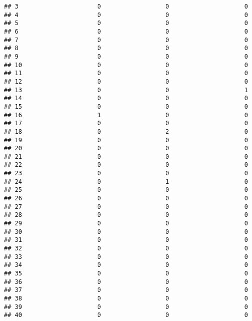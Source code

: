 \documentclass[
]{article}
\begin{document}
\begin{verbatim}
## 3                      0                  0                     0
## 4                      0                  0                     0
## 5                      0                  0                     0
## 6                      0                  0                     0
## 7                      0                  0                     0
## 8                      0                  0                     0
## 9                      0                  0                     0
## 10                     0                  0                     0
## 11                     0                  0                     0
## 12                     0                  0                     0
## 13                     0                  0                     1
## 14                     0                  0                     0
## 15                     0                  0                     0
## 16                     1                  0                     0
## 17                     0                  0                     0
## 18                     0                  2                     0
## 19                     0                  0                     0
## 20                     0                  0                     0
## 21                     0                  0                     0
## 22                     0                  0                     0
## 23                     0                  0                     0
## 24                     0                  1                     0
## 25                     0                  0                     0
## 26                     0                  0                     0
## 27                     0                  0                     0
## 28                     0                  0                     0
## 29                     0                  0                     0
## 30                     0                  0                     0
## 31                     0                  0                     0
## 32                     0                  0                     0
## 33                     0                  0                     0
## 34                     0                  0                     0
## 35                     0                  0                     0
## 36                     0                  0                     0
## 37                     0                  0                     0
## 38                     0                  0                     0
## 39                     0                  0                     0
## 40                     0                  0                     0

\end{verbatim}
\end{document}
